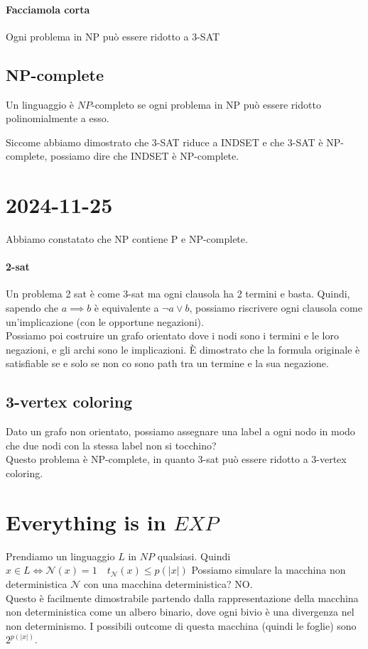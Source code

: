 \documentclass{article}
\begin{document}
\paragraph{Facciamola corta} Ogni problema in NP può essere ridotto a 3-SAT

\subsection{NP-complete}
Un linguaggio è $NP$-completo se ogni problema in NP può essere ridotto polinomialmente a esso.

Siccome abbiamo dimostrato che 3-SAT riduce a INDSET e che 3-SAT è NP-complete, possiamo dire che INDSET è NP-complete.

\section{2024-11-25}
Abbiamo constatato che NP contiene P e NP-complete.

\paragraph{2-sat}
Un problema 2 sat è come 3-sat ma ogni clausola ha 2 termini e basta. Quindi, sapendo che $a\implies b$ è equivalente a $\neg a \vee b$, possiamo riscrivere ogni clausola come un'implicazione (con le opportune negazioni).\\
Possiamo poi costruire un grafo orientato dove i nodi sono i termini e le loro negazioni, e gli archi sono le implicazioni. È dimostrato che la formula originale è satisfiable se e solo se non co sono path tra un termine e la sua negazione.

\subsection{3-vertex coloring}
Dato un grafo non orientato, possiamo assegnare una label a ogni nodo in modo che due nodi con la stessa label non si tocchino?\\
Questo problema è NP-complete, in quanto 3-sat può essere ridotto a 3-vertex coloring.

\section{Everything is in $EXP$}
Prendiamo un linguaggio $L$ in $NP$ qualsiasi. Quindi $x\in L \iff \mathcal N(x)=1 \quad t_\mathcal N(x)\leq p(|x|)$
Possiamo simulare la macchina non deterministica $\mathcal{N}$ con una macchina deterministica? NO. \\
Questo è facilmente dimostrabile partendo dalla rappresentazione della macchina non deterministica come un albero binario, dove ogni bivio è una divergenza nel non determinismo. I possibili outcome di questa macchina (quindi le foglie) sono $2^{p(|x|)}$.
\end{document}
